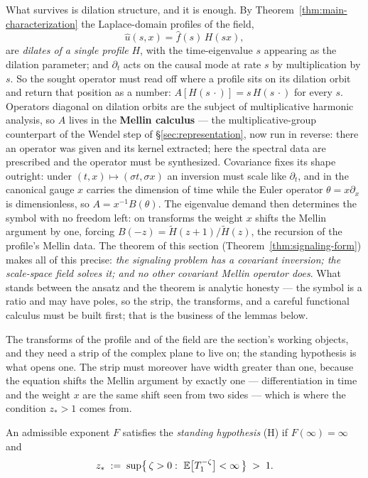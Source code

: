What survives is dilation structure, and it is enough. By
Theorem~\ref{thm:main-characterization} the Laplace-domain profiles of the field,
\[
  \hat u(s, x) = \hat f(s)\, H(sx),
\]
are \emph{dilates of a single profile} $H$, with the time-eigenvalue $s$ appearing as
the dilation parameter; and $\partial_t$ acts on the causal mode at rate $s$ by
multiplication by $s$. So the sought operator must read off where a profile sits on its
dilation orbit and return that position as a number: $A[H(s\,\cdot)] = s\,H(s\,\cdot)$
for every $s$. Operators diagonal on dilation orbits are the subject of multiplicative
harmonic analysis, so $A$ lives in the \textbf{Mellin calculus} --- the
multiplicative-group counterpart of the Wendel step of \S\ref{sec:representation}, now
run in reverse: there an operator was given and its kernel extracted; here the spectral
data are prescribed and the operator must be synthesized. Covariance fixes its shape
outright: under $(t,x) \mapsto (\sigma t, \sigma x)$ an inversion must scale like
$\partial_t$, and in the canonical gauge $x$ carries the dimension of time while the
Euler operator $\theta = x\partial_x$ is dimensionless, so $A = x^{-1}B(\theta)$.
The eigenvalue demand then determines the symbol with no freedom left: on
transforms the weight $x$ shifts the Mellin argument by one, forcing $B(-z) =
\tilde H(z+1)/\tilde H(z)$, the recursion of the profile's Mellin data. The theorem of
this section (Theorem~\ref{thm:signaling-form}) makes all of this precise: \emph{the
signaling problem has a covariant inversion; the scale-space field solves it; and no
other covariant Mellin operator does}. What stands between the ansatz and the theorem
is analytic honesty --- the symbol is a ratio and may have poles, so the strip, the
transforms, and a careful functional calculus must be built first; that is the business
of the lemmas below.

The transforms of the profile and of the field are the section's working objects, and
they need a strip of the complex plane to live on; the standing hypothesis is what
opens one. The strip must moreover have width greater than one, because the equation
shifts the Mellin argument by exactly one --- differentiation in time and the weight
$x$ are the same shift seen from two sides --- which is where the condition $z_* > 1$
comes from.

\begin{definition}\label{def:standing-hypothesis}
An admissible exponent $F$ satisfies the \emph{standing hypothesis} (H) if
$F(\infty) = \infty$ and
\[
  z_* \;:=\; \sup\bigl\{\, \zeta > 0 :\ \mathbb{E}\bigl[T_1^{-\zeta}\bigr] < \infty \,\bigr\} \;>\; 1 .
\]
\end{definition}

